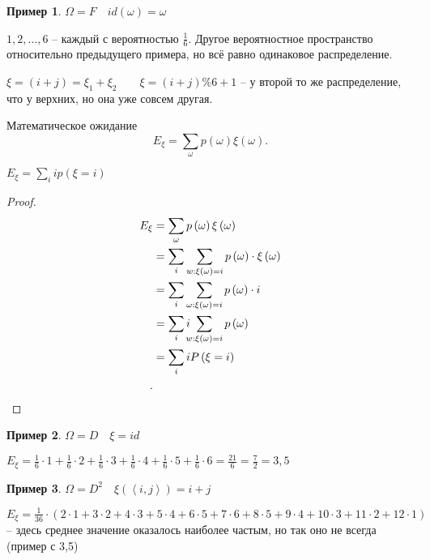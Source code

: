 \documentclass{book}
\theoremstyle{definition}
\newtheorem*{example}{Пример}
\begin{document}
\begin{example}
    $\Omega = F\quad id(\omega) = \omega$

    $1, 2, \ldots, 6$ -- каждый с вероятностью $\frac{1}{6}$. Другое вероятностное пространство относительно предыдущего примера, но всё равно одинаковое распределение.

    $\xi = (i+j) = \xi_1 + \xi_2\qquad \xi = (i+j)\%6 +1$ -- у второй то же распределение, что у верхних, но она уже совсем другая.
\end{example}

\begin{definition}
    Математическое ожидание \[
        E_{\xi} = \sum_{\omega}p\left( \omega \right) \xi(\omega)
    .\] 

\end{definition}
\begin{statement}
    $E_{\xi} = \sum_i ip(\xi = i)$ 
\end{statement}
\begin{proof}
     \begin{align*}
         E_{\xi} &= \sum_{\omega}p\left( \omega \right) \xi\left( \omega \right)  \\
                 &= \sum_i\sum_{w:\xi(\omega) = i}p\left( \omega \right) \cdot  \xi\left(\omega  \right)\\
                 &= \sum_i\sum_{\omega:\xi\left( \omega \right) =i}p\left( \omega \right) \cdot i \\
                 &= \sum_i i\negthickspace\negthickspace\sum_{w:\xi\left( \omega \right) =i} p\left( \omega \right) \\
                 &= \sum_i iP\left( \xi = i \right)  \\
    .\end{align*}
\end{proof}

\begin{example}
    $\Omega = D\quad \xi = id$

    $E_{\xi} = \frac{1}{6}\cdot 1 + \frac{1}{6}\cdot 2 + \frac{1}{6}\cdot 3 + \frac{1}{6}\cdot 4 + \frac{1}{6}\cdot 5 + \frac{1}{6}\cdot 6 = \frac{21}{6} = \frac{7}{2} = 3,5$
\end{example}

\begin{example}
    $\Omega = D^2\quad \xi \left( \left<i, j \right> \right) = i+j$

    $E_{\xi} = \frac{1}{36}\cdot \left( 2\cdot 1+3\cdot 2+4\cdot 3+5\cdot 4+6\cdot 5+7\cdot 6+8\cdot 5+9\cdot 4+10\cdot 3+11\cdot 2+12\cdot 1 \right) $ -- здесь среднее значение оказалось наиболее частым, но так оно не всегда (пример с 3,5)
\end{example}
\end{document}
